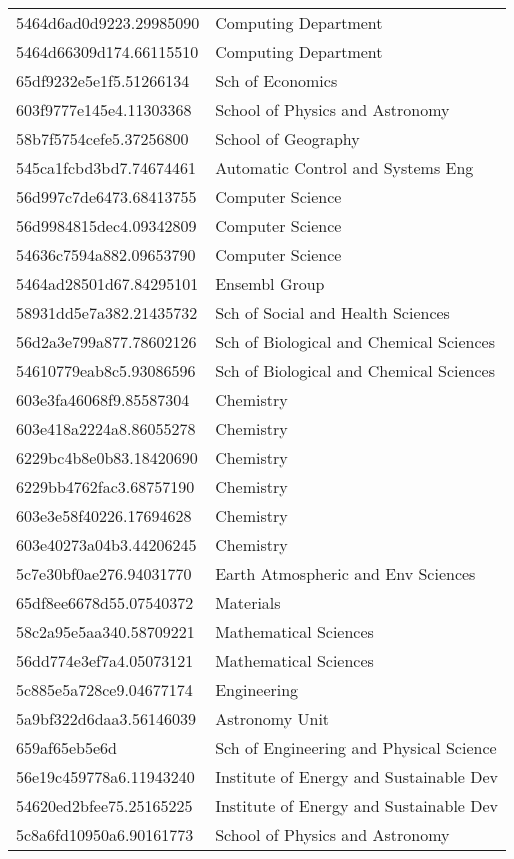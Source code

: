 \begin{tabular}{ll}
5464d6ad0d9223.29985090 & Computing Department \\
5464d66309d174.66115510 & Computing Department \\
65df9232e5e1f5.51266134 & Sch of Economics \\
603f9777e145e4.11303368 & School of Physics and Astronomy \\
58b7f5754cefe5.37256800 & School of Geography \\
545ca1fcbd3bd7.74674461 & Automatic Control and Systems Eng \\
56d997c7de6473.68413755 & Computer Science \\
56d9984815dec4.09342809 & Computer Science \\
54636c7594a882.09653790 & Computer Science \\
5464ad28501d67.84295101 & Ensembl Group \\
58931dd5e7a382.21435732 & Sch of Social and Health Sciences \\
56d2a3e799a877.78602126 & Sch of Biological and Chemical Sciences \\
54610779eab8c5.93086596 & Sch of Biological and Chemical Sciences \\
603e3fa46068f9.85587304 & Chemistry \\
603e418a2224a8.86055278 & Chemistry \\
6229bc4b8e0b83.18420690 & Chemistry \\
6229bb4762fac3.68757190 & Chemistry \\
603e3e58f40226.17694628 & Chemistry \\
603e40273a04b3.44206245 & Chemistry \\
5c7e30bf0ae276.94031770 & Earth Atmospheric and Env Sciences \\
65df8ee6678d55.07540372 & Materials \\
58c2a95e5aa340.58709221 & Mathematical Sciences \\
56dd774e3ef7a4.05073121 & Mathematical Sciences \\
5c885e5a728ce9.04677174 & Engineering \\
5a9bf322d6daa3.56146039 & Astronomy Unit \\
659af65eb5e6d & Sch of Engineering and Physical Science \\
56e19c459778a6.11943240 & Institute of Energy and Sustainable Dev \\
54620ed2bfee75.25165225 & Institute of Energy and Sustainable Dev \\
5c8a6fd10950a6.90161773 & School of Physics and Astronomy \\

\end{tabular}
